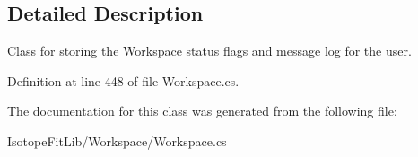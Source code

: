 \subsection{Detailed Description}
Class for storing the \hyperlink{class_isotope_fit_1_1_workspace}{Workspace} status flags and message log for the user. 



Definition at line 448 of file Workspace.\+cs.



The documentation for this class was generated from the following file\+:\begin{DoxyCompactItemize}
\item 
Isotope\+Fit\+Lib/\+Workspace/Workspace.\+cs\end{DoxyCompactItemize}
